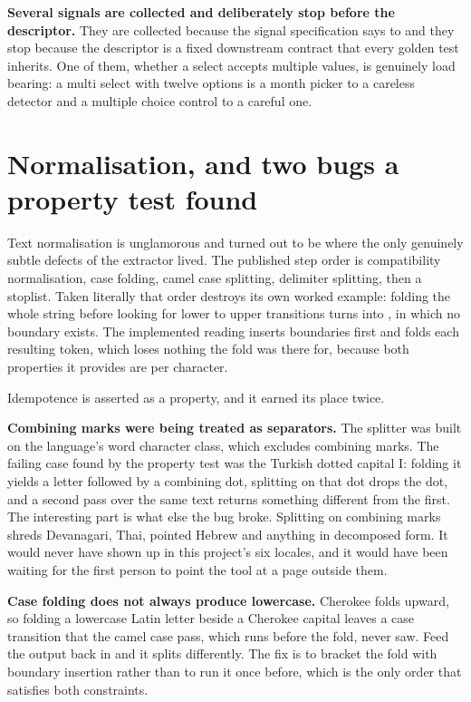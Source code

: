 \textbf{Several signals are collected and deliberately stop before the
descriptor.} They are collected because the signal specification says to and
they stop because the descriptor is a fixed downstream contract that every
golden test inherits. One of them, whether a select accepts multiple values, is
genuinely load bearing: a multi select with twelve options is a month picker to
a careless detector and a multiple choice control to a careful one.

\section{Normalisation, and two bugs a property test found}

Text normalisation is unglamorous and turned out to be where the only genuinely
subtle defects of the extractor lived. The published step order is compatibility
normalisation, case folding, camel case splitting, delimiter splitting, then a
stoplist. Taken literally that order destroys its own worked example: folding
the whole string before looking for lower to upper transitions turns
 into , in which no boundary exists. The
implemented reading inserts boundaries first and folds each resulting token,
which loses nothing the fold was there for, because both properties it provides
are per character.

Idempotence is asserted as a property, and it earned its place twice.

\textbf{Combining marks were being treated as separators.} The splitter was
built on the language's word character class, which excludes combining marks.
The failing case found by the property test was the Turkish dotted capital I:
folding it yields a letter followed by a combining dot, splitting on that dot
drops the dot, and a second pass over the same text returns something different
from the first. The interesting part is what else the bug broke. Splitting on
combining marks shreds Devanagari, Thai, pointed Hebrew and anything in
decomposed form. It would never have shown up in this project's six locales, and
it would have been waiting for the first person to point the tool at a page
outside them.

\textbf{Case folding does not always produce lowercase.} Cherokee folds upward,
so folding a lowercase Latin letter beside a Cherokee capital leaves a case
transition that the camel case pass, which runs before the fold, never saw. Feed
the output back in and it splits differently. The fix is to bracket the fold with
boundary insertion rather than to run it once before, which is the only order
that satisfies both constraints.

